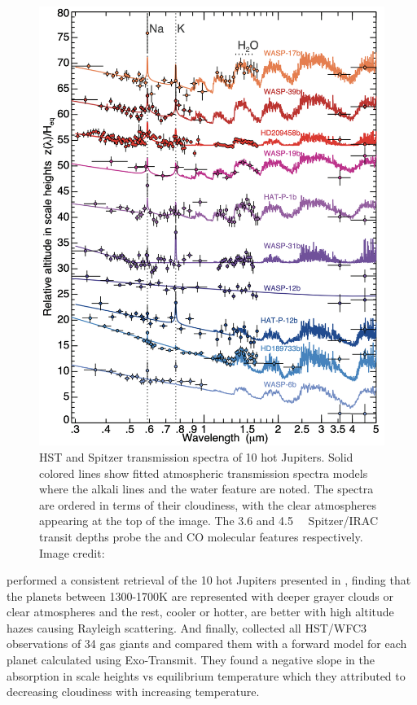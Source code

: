 \begin{figure}
    \centering
    \includegraphics[width = \linewidth]{singetal.png}
    \caption{HST and Spitzer transmission spectra of 10 hot Jupiters. Solid colored lines show fitted atmospheric transmission spectra models where the alkali lines and the water feature are noted. The spectra are ordered in terms of their cloudiness, with the clear atmospheres appearing at the top of the image. The 3.6 and 4.5~\um~ Spitzer/IRAC transit depths probe the  and CO molecular features respectively. Image credit: \citet{Sing2016}}
    \label{int:fig:singetal}
\end{figure}

\citet{Barstow2017} performed a consistent retrieval of the 10 hot Jupiters presented in \citet{Sing2016}, finding that the planets between 1300-1700K are represented with deeper grayer clouds or clear atmospheres and the rest, cooler or hotter, are better with high altitude hazes causing Rayleigh scattering. And finally, \citet{Fu2017} collected all HST/WFC3 observations of 34 gas giants and compared them with a forward model for each planet calculated using Exo-Transmit. They found a negative slope in the absorption in scale heights vs equilibrium temperature which they attributed to decreasing cloudiness with increasing temperature.

